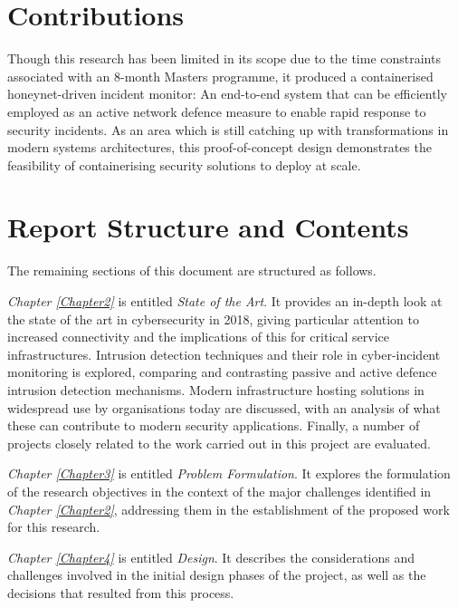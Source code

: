 \section{Contributions} \label{ContributionsOfResearch}

Though this research has been limited in its scope due to the time constraints associated with an 8-month Masters programme, it produced a containerised honeynet-driven incident monitor: An end-to-end system that can be efficiently employed as an active network defence measure to enable rapid response to security incidents. As an area which is still catching up with transformations in modern systems architectures, this proof-of-concept design demonstrates the feasibility of containerising security solutions to deploy at scale.





\section{Report Structure and Contents} \label{ReportStructure}
The remaining sections of this document are structured as follows.

\textit{Chapter \ref{Chapter2}} is entitled \textit{State of the Art}. It provides an in-depth look at the state of the art in cybersecurity in 2018, giving particular attention to increased connectivity and the implications of this for critical service infrastructures. Intrusion detection techniques and their role in cyber-incident monitoring is explored, comparing and contrasting passive and active defence intrusion detection mechanisms. Modern infrastructure hosting solutions in widespread use by organisations today are discussed, with an analysis of what these can contribute to modern security applications. Finally, a number of projects closely related to the work carried out in this project are evaluated.

\textit{Chapter \ref{Chapter3}} is entitled \textit{Problem Formulation}. It explores the formulation of the research objectives in the context of the major challenges identified in \textit{Chapter \ref{Chapter2}}, addressing them in the establishment of the proposed work for this research.

\textit{Chapter \ref{Chapter4}} is entitled \textit{Design}. It describes the considerations and challenges involved in the initial design phases of the project, as well as the decisions that resulted from this process.


